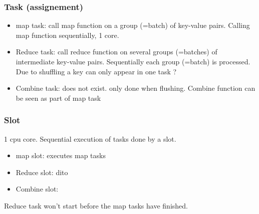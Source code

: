 \subsubsection{Task (assignement)}

\begin{itemize}
    \item map task: call map function on a group (=batch) of key-value pairs. Calling map function sequentially, 1 core.
    \item Reduce task: call reduce function on several groups (=batches) of intermediate key-value pairs.
    Sequentially each group (=batch) is processed. Due to shuffling a key can only appear in one task ?
    \item Combine task: does not exist. only done when flushing. Combine function can be seen as part of map task
\end{itemize}


\subsubsection{Slot}
1 cpu core.  Sequential execution of tasks done by a slot.
\begin{itemize}
    \item map slot: executes map tasks
    \item Reduce slot: dito
    \item Combine slot:
\end{itemize}

Reduce task won't start before the map tasks have finished.












